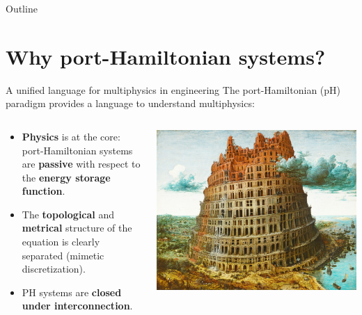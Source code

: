 \documentclass[aspectratio=169]{beamer}
\begin{document}
	
	
	\begin{frame}[plain]
		
		
		
	\end{frame}

	
	\begin{frame}{Outline}
		
		\tableofcontents
		
	\end{frame}

\section{Why port-Hamiltonian systems?}


\begin{frame}{A unified language for multiphysics in engineering}
	The port-Hamiltonian (pH) paradigm provides a language to understand multiphysics:

	\vspace{.3cm}
	
	\begin{columns}
		\begin{column}{.65\textwidth}
			\begin{itemize}
				\item \textbf{Physics} is at the core: port-Hamiltonian systems are \textbf{passive} with respect to the \textbf{energy storage function}.
				\item The \textbf{topological} and \textbf{metrical} structure of the equation is clearly separated (mimetic discretization).
				\item PH systems are \textbf{closed under interconnection}. 
			\end{itemize}
		\end{column}
		\begin{column}{.35\textwidth}
			\centering
			\includegraphics[width=.9\columnwidth]{babel_tower.jpeg}
		\end{column}
	\end{columns}

	
\end{frame}
\end{document}
